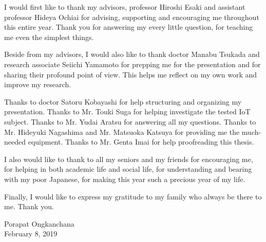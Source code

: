 I would first like to thank my advisors, professor Hiroshi Esaki and assistant professor Hideya Ochiai for advising, supporting and encouraging me throughout this entire year. Thank you for answering my every little question, for teaching me even the simplest things.  

Beside from my advisors, I would also like to thank doctor Manabu Tsukada and research associate Seiichi Yamamoto for prepping me for the presentation and for sharing their profound point of view. This helps me reflect on my own work and improve my research. 

Thanks to doctor Satoru Kobayashi for help structuring and organizing my presentation. 
Thanks to Mr. Touki Suga for helping investigate the tested IoT subject. 
Thanks to Mr. Yudai Aratsu for answering all my questions. 
Thanks to Mr. Hideyuki Nagashima and Mr. Matsuoka Katsuya for providing me the much-needed equipment. 
Thanks to Mr. Genta Imai for help proofreading this thesis.

I also would like to thank to all my seniors and my friends for encouraging me, for helping in both academic life and social life, for understanding and bearing with my poor Japanese, for making this year such a precious year of my life. 

Finally, I would like to express my gratitude to my family who always be there to me.  
Thank you.

\begin{flushright}
    Porapat Ongkanchana \\
    February 8, 2019
\end{flushright}
